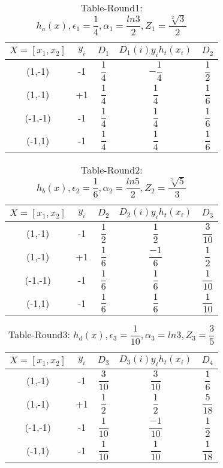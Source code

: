 \documentclass{article}
\begin{document}
\begin{longtable}{c|c|c|c|c}
	\caption{Table-Round1: $h_{a}(x), \epsilon_{1} = \dfrac{1}{4}, \alpha_{1}=\dfrac{ln3}{2}, Z_{1} = \dfrac{\sqrt[2]{3}}{2}$} \\
  \hline\hline
	  $X=[x_{1},x_{2}]$ & $y_{i}$ & $D_{1}$ & $D_{1}(i)y_{i}h_{t}(x_{i})$ & $D_{2}$ \\[0.5ex]
  \hline
  (1,-1) & -1 & $\dfrac{1}{4}$ & $-\dfrac{1}{4}$ & $\dfrac{1}{2}$ \\
  (1,-1) & +1 & $\dfrac{1}{4}$ & $\dfrac{1}{4}$ & $\dfrac{1}{6}$ \\
  (-1,-1) & -1 & $\dfrac{1}{4}$ & $\dfrac{1}{4}$ & $\dfrac{1}{6}$ \\
	  (-1,1) & -1 & $\dfrac{1}{4}$ & $\dfrac{1}{4}$ & $\dfrac{1}{6}$ \\ [0.5ex]
  \end{longtable}

\begin{longtable}{c|c|c|c|c}
	\caption{Table-Round2: $h_{b}(x), \epsilon_{2} = \dfrac{1}{6}, \alpha_{2}=\dfrac{ln5}{2}, Z_{2} = \dfrac{\sqrt[2]{5}}{3}$} \\
  \hline\hline
	  $X=[x_{1},x_{2}]$ & $y_{i}$ & $D_{2}$ & $D_{2}(i)y_{i}h_{t}(x_{i})$ & $D_{3}$ \\[0.5ex]
  \hline
 	  (1,-1) & -1 & $\dfrac{1}{2}$ & $\dfrac{1}{2}$ & $\dfrac{3}{10}$ \\
	  (1,-1) & +1 & $\dfrac{1}{6}$ & $\dfrac{-1}{6}$ & $\dfrac{1}{2}$ \\
	  (-1,-1) & -1 & $\dfrac{1}{6}$ & $\dfrac{1}{6}$ & $\dfrac{1}{10}$ \\
	  (-1,1) & -1 & $\dfrac{1}{6}$ & $\dfrac{1}{6}$ & $\dfrac{1}{10}$ \\[0.5ex]
  \end{longtable}

\begin{longtable}{c|c|c|c|c}
	\caption{Table-Round3: $h_{d}(x), \epsilon_{3} = \dfrac{1}{10}, \alpha_{3}=ln3, Z_{3} = \dfrac{3}{5}$} \\
  \hline\hline
	  $X=[x_{1},x_{2}]$ & $y_{i}$ & $D_{3}$ & $D_{3}(i)y_{i}h_{t}(x_{i})$ & $D_{4}$ \\[0.5ex]
  \hline
	  (1,-1) & -1 & $\dfrac{3}{10}$ & $\dfrac{3}{10}$ & $\dfrac{1}{6}$\\
	  (1,-1) & +1 & $\dfrac{1}{2}$ & $\dfrac{1}{2}$ & $\dfrac{5}{18}$\\
	  (-1,-1) & -1 & $\dfrac{1}{10}$ & $\dfrac{-1}{10}$ & $\dfrac{1}{2}$\\
	  (-1,1) & -1 & $\dfrac{1}{10}$ & $\dfrac{1}{10}$ & $\dfrac{1}{18}$ \\[0.5ex]
  \end{longtable}
\end{document}
